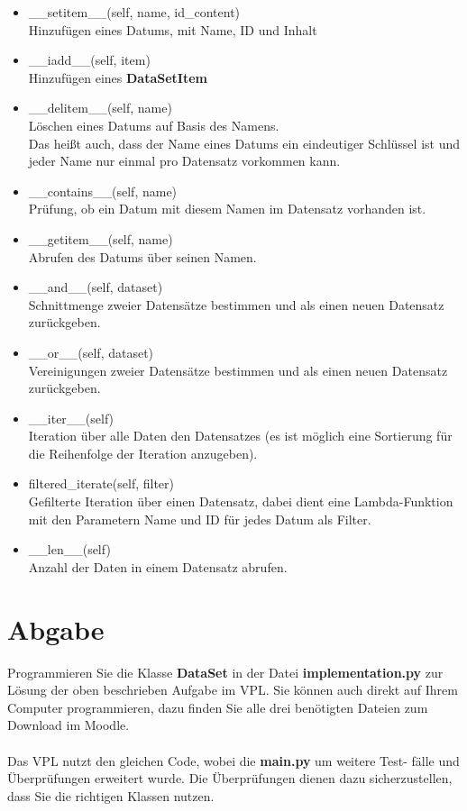 \documentclass{scrartcl}
\begin{document}
            \begin{itemize}
                \item \_\_setitem\_\_(self, name, id\_content)\\Hinzufügen eines Datums, mit Name, ID und Inhalt
                \item \_\_iadd\_\_(self, item)\\Hinzufügen eines \textbf{DataSetItem}
                \item \_\_delitem\_\_(self, name)\\Löschen eines Datums auf Basis des Namens.\\Das heißt auch, dass der Name eines Datums ein eindeutiger Schlüssel ist und jeder Name nur einmal pro Datensatz vorkommen kann.
                \item \_\_contains\_\_(self, name)\\Prüfung, ob ein Datum mit diesem Namen im Datensatz vorhanden ist.
                \item \_\_getitem\_\_(self, name)\\Abrufen des Datums über seinen Namen.
                \item \_\_and\_\_(self, dataset)\\Schnittmenge zweier Datensätze bestimmen und als einen neuen Datensatz zurückgeben.
                \item \_\_or\_\_(self, dataset)\\Vereinigungen zweier Datensätze bestimmen und als einen neuen Datensatz zurückgeben.
                \item \_\_iter\_\_(self)\\Iteration über alle Daten den Datensatzes (es ist möglich eine Sortierung für die Reihenfolge der Iteration anzugeben).
                \item filtered\_iterate(self, filter)\\Gefilterte Iteration über einen Datensatz, dabei dient eine Lambda-Funktion mit den Parametern Name und ID für jedes Datum als Filter.
                \item \_\_len\_\_(self)\\Anzahl der Daten in einem Datensatz abrufen.
            \end{itemize}

    \section{Abgabe}

        Programmieren Sie die Klasse \textbf{DataSet} in der Datei \textbf{implementation.py} zur 
        Lösung der oben beschrieben Aufgabe im VPL. Sie können auch direkt auf
        Ihrem Computer programmieren, dazu finden Sie alle drei benötigten Dateien
        zum Download im Moodle.\\
        \\
        Das VPL nutzt den gleichen Code, wobei die \textbf{main.py} um weitere Test-
        fälle und Überprüfungen erweitert wurde. Die Überprüfungen dienen dazu
        sicherzustellen, dass Sie die richtigen Klassen nutzen.
\end{document}
